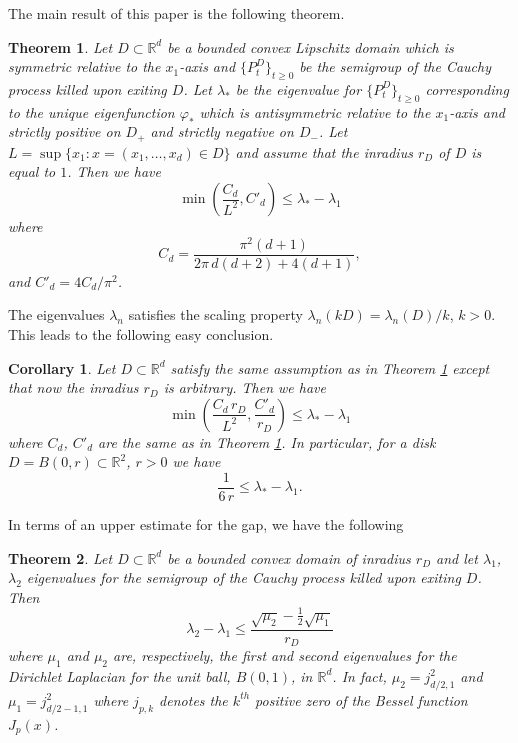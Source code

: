 \documentclass[11pt,leqno]{article}
\newtheorem{thm}{Theorem}[section]
\newtheorem{cor}{Corollary}[section]
\theoremstyle{definition}
\newcommand{\Rd}{\mathbb{R}^d}
\newcommand{\Rt}{\mathbb{R}^2}
\numberwithin{equation}{section}
\begin{document}
 The main result of this paper is the following theorem.

\begin{thm}
\label{main}
Let $D \subset \Rd$ be a bounded convex Lipschitz domain which is
symmetric relative to the $x_1$-axis and $\{P_t^D\}_{t \ge 0}$ be the
semigroup of the Cauchy process killed upon exiting $D$. Let $\lambda_*$ be
 the eigenvalue for $\{P_t^D\}_{t \ge 0}$ corresponding to the unique eigenfunction $\varphi_*$ which is
antisymmetric relative to the $x_1$-axis and strictly positive on $D_+$ and strictly negative on $D_-$.  Let
$L = \sup\{x_1: x=(x_1,\ldots,x_d) \in D\}$ and assume that the inradius $r_D$ of $D$ is equal
to
$1$. Then we have
\begin{equation}\label{lower}
 \min \left( \frac{C_d}{L^2}, C'_d \right)\leq \lambda_* - \lambda_1 
\end{equation}
where
$$
C_d =  \frac{\pi^2 (d+1)}{2 \pi \, d (d+2) + 4 (d+1)},
$$
and $C'_d = 4 C_d/\pi^2$.
\end{thm}




The eigenvalues $\lambda_n$ satisfies the scaling property
 $\lambda_n(kD) = \lambda_n(D)/k$, $k > 0$. This leads to the following easy conclusion.

\begin{cor}
Let $D\subset \Rd$ satisfy the same assumption as in Theorem \ref{main} except that
 now the inradius $r_D$ is arbitrary. Then we have
\begin{equation}
 \min \left(\frac{ C_d \, r_D}{L^2}, \frac{C'_d}{r_D} \right)\leq \lambda_* - \lambda_1 
\end{equation}
where $C_d$, $C'_d$ are the same as in Theorem \ref{main}.
In particular,  for a disk $D = B(0,r) \subset \Rt$, $r>0$ we have
$$
 \frac{1}{6 \, r}\leq \lambda_* - \lambda_1. 
$$ 
\end{cor}

In terms of an upper estimate for the gap,  we have the following 
\begin{thm}\label{upperestimate}
Let $D\subset \Rd$ be a bounded convex domain of inradius $r_D$ and let 
$\lambda_1$,
$\lambda_2$ eigenvalues for the semigroup of the Cauchy process killed upon exiting $D$. 
Then 
\begin{equation}\label{upper}
 \lambda_2 - \lambda_1 \leq
{\frac{\sqrt{\mu_2}-{\frac{1}{2}}\sqrt{\mu_1}}{r_D}}
\end{equation}
where $\mu_1$ and $\mu_2$ are, respectively, the first and second
 eigenvalues for the Dirichlet Laplacian for the unit ball, $B(0, 1)$, in $\Rd$.  In fact, $\mu_2=j_{{d/2}, 1}^2$ and 
 $\mu_1=j_{{d/2-1}, 1}^2$ where $j_{p, k}$ denotes the $k^{th}$ positive zero of the Bessel
function
$J_p(x)$. 
\end{thm}
\end{document}
